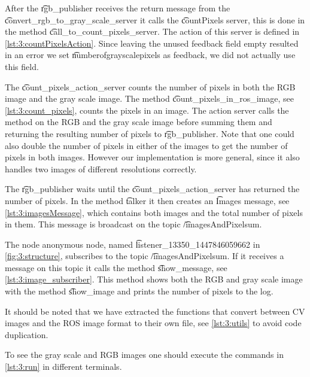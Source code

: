 After the \t{rgb_publisher} receives the return message from the \t{convert_rgb_to_gray_scale_server} it calls the \t{countPixels} server, this is done in the method \t{call_to_count_pixels_server}. The action of this server is defined in \cref{lst:3:countPixelsAction}. Since leaving the unused feedback field empty resulted in an error we set \t{numberofgrayscalepixels} as feedback, we did not actually use this field. 



The \t{count_pixels_action_server} counts the number of pixels in both the RGB image and the gray scale image. The method \t{count_pixels_in_ros_image}, see \cref{lst:3:count_pixels}, counts the pixels in an image. The action server calls the method on the RGB and the gray scale image before summing them and returning the resulting number of pixels to \t{rgb_publisher}. Note that one could also double the number of pixels in either of the images to get the number of pixels in both images. However our implementation is more general, since it also handles two images of different resolutions correctly. 

The \t{rgb_publisher} waits until the \t{count_pixels_action_server} has returned the number of pixels. In the method \t{talker} it then creates an \t{Images} message, see \cref{lst:3:imagesMessage}, which contains both images and the total number of pixels in them.  This message is broadcast on the topic \t{/imagesAndPixelsum}.



The node anonymous node, named \t{listener_13350_1447846059662} in \cref{fig:3:structure}, subscribes to the topic \t{/imagesAndPixelsum}. If it receives a message on this topic it calls the method \t{show_message}, see \cref{lst:3:image_subscriber}. This method shows both the RGB and gray scale image with the method \t{show_image} and prints the number of pixels to the log. 

It should be noted that we have extracted the functions that convert between CV images and the ROS image format to their own file, see \cref{lst:3:utils} to avoid code duplication.

To see the gray scale and RGB images one should execute the commands in \cref{lst:3:run} in different terminals.

